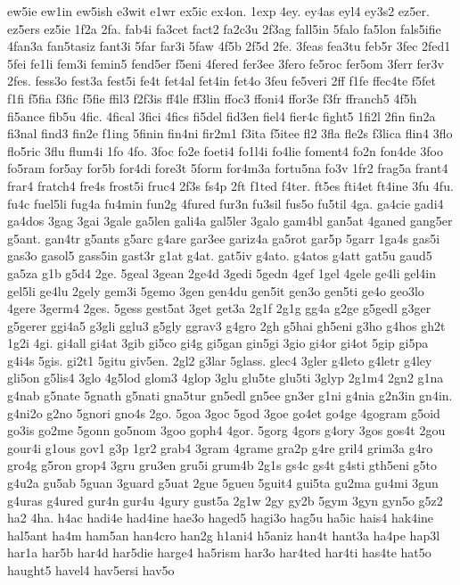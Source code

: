 {ew5ie
ew1in
ew5ish
e3wit
e1wr
ex5ic
ex4on.
1exp
4ey.
ey4as
eyl4
ey3s2
ez5er.
ez5ers
ez5ie
1f2a
2fa.
fab4i
fa3cet
fact2
fa2c3u
2f3ag
fall5in
5falo
fa5lon
fals5ifie
4fan3a
fan5tasiz
fant3i
5far
far3i
5faw
4f5b
2f5d
2fe.
3feas
fea3tu
feb5r
3fec
2fed1
5fei
fe1li
fem3i
femin5
fend5er
f5eni
4fered
fer3ee
3fero
fe5roc
fer5om
3ferr
fer3v
2fes.
fess3o
fest3a
fest5i
fe4t
fet4al
fet4in
fet4o
3feu
fe5veri
2ff
f1fe
ffec4te
f5fet
f1fi
f5fia
f3fic
f5fie
ffil3
f2f3is
ff4le
ff3lin
ffoc3
ffoni4
ffor3e
f3fr
ffranch5
4f5h
fi5ance
fib5u
4fic.
4fical
3fici
4fics
fi5del
fid3en
fiel4
fier4c
fight5
1fi2l
2fin
fin2a
fi3nal
find3
fin2e
f1ing
5finin
fin4ni
fir2m1
f3ita
f5itee
fl2
3fla
fle2s
f3lica
flin4
3flo
flo5ric
3flu
flum4i
1fo
4fo.
3foc
fo2e
foeti4
fo1l4i
fo4lie
foment4
fo2n
fon4de
3foo
fo5ram
for5ay
for5b
for4di
fore3t
5form
for4m3a
fortu5na
fo3v
1fr2
frag5a
frant4
frar4
fratch4
fre4s
frost5i
fruc4
2f3s
fs4p
2ft
f1ted
f4ter.
ft5es
fti4et
ft4ine
3fu
4fu.
fu4c
fuel5li
fug4a
fu4min
fun2g
4fured
fur3n
fu3sil
fus5o
fu5til
4ga.
ga4cie
gadi4
ga4dos
3gag
3gai
3gale
ga5len
gali4a
gal5ler
3galo
gam4bl
gan5at
4ganed
gang5er
g5ant.
gan4tr
g5ants
g5arc
g4are
gar3ee
gariz4a
ga5rot
gar5p
5garr
1ga4s
gas5i
gas3o
gasol5
gass5in
gast3r
g1at
g4at.
gat5iv
g4ato.
g4atos
g4att
gat5u
gaud5
ga5za
g1b
g5d4
2ge.
5geal
3gean
2ge4d
3gedi
5gedn
4gef
1gel
4gele
ge4li
gel4in
gel5li
ge4lu
2gely
gem3i
5gemo
3gen
gen4du
gen5it
gen3o
gen5ti
ge4o
geo3lo
4gere
3germ4
2ges.
5gess
gest5at
3get
get3a
2g1f
2g1g
gg4a
g2ge
g5gedl
g3ger
g5gerer
ggi4a5
g3gli
gglu3
g5gly
ggrav3
g4gro
2gh
g5hai
gh5eni
g3ho
g4hos
gh2t
1g2i
4gi.
gi4all
gi4at
3gib
gi5co
gi4g
gi5gan
gin5gi
3gio
gi4or
gi4ot
5gip
gi5pa
g4i4s
5gis.
gi2t1
5gitu
giv5en.
2gl2
g3lar
5glass.
glec4
3gler
g4leto
g4letr
g4ley
gli5on
g5lis4
3glo
4g5lod
glom3
4glop
3glu
glu5te
glu5ti
3glyp
2g1m4
2gn2
g1na
g4nab
g5nate
5gnath
g5nati
gna5tur
gn5edl
gn5ee
gn3er
g1ni
g4nia
g2n3in
gn4in.
g4ni2o
g2no
5gnori
gno4s
2go.
5goa
3goc
5god
3goe
go4et
go4ge
4gogram
g5oid
go3is
go2me
5gonn
go5nom
3goo
goph4
4gor.
5gorg
4gors
g4ory
3gos
gos4t
2gou
gour4i
g1ous
gov1
g3p
1gr2
grab4
3gram
4grame
gra2p
g4re
gril4
grim3a
g4ro
gro4g
g5ron
grop4
3gru
gru3en
gru5i
grum4b
2g1s
gs4c
gs4t
g4sti
gth5eni
g5to
g4u2a
gu5ab
5guan
3guard
g5uat
2gue
5gueu
5guit4
gui5ta
gu2ma
gu4mi
3gun
g4uras
g4ured
gur4n
gur4u
4gury
gust5a
2g1w
2gy
gy2b
5gym
3gyn
gyn5o
g5z2
ha2
4ha.
h4ac
hadi4e
had4ine
hae3o
haged5
hagi3o
hag5u
ha5ic
hais4
hak4ine
hal5ant
ha4m
ham5an
han4cro
han2g
h1ani4
h5aniz
han4t
hant3a
ha4pe
hap3l
har1a
har5b
har4d
har5die
harge4
ha5rism
har3o
har4ted
har4ti
has4te
hat5o
haught5
havel4
hav5ersi
hav5o
}

